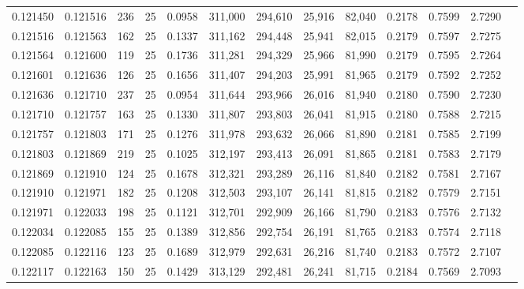 \begin{tabular}{rrrrrrrrrrrrr}
0.121450 & 0.121516 &   236 &  25 &                                     0.0958 & 311,000 & 294,610 &  25,916 &  82,040 & 0.2178 & 0.7599 & 2.7290 \\
0.121516 & 0.121563 &   162 &  25 &                                     0.1337 & 311,162 & 294,448 &  25,941 &  82,015 & 0.2179 & 0.7597 & 2.7275 \\
0.121564 & 0.121600 &   119 &  25 &                                     0.1736 & 311,281 & 294,329 &  25,966 &  81,990 & 0.2179 & 0.7595 & 2.7264 \\
0.121601 & 0.121636 &   126 &  25 &                                     0.1656 & 311,407 & 294,203 &  25,991 &  81,965 & 0.2179 & 0.7592 & 2.7252 \\
0.121636 & 0.121710 &   237 &  25 &                                     0.0954 & 311,644 & 293,966 &  26,016 &  81,940 & 0.2180 & 0.7590 & 2.7230 \\
0.121710 & 0.121757 &   163 &  25 &                                     0.1330 & 311,807 & 293,803 &  26,041 &  81,915 & 0.2180 & 0.7588 & 2.7215 \\
0.121757 & 0.121803 &   171 &  25 &                                     0.1276 & 311,978 & 293,632 &  26,066 &  81,890 & 0.2181 & 0.7585 & 2.7199 \\
0.121803 & 0.121869 &   219 &  25 &                                     0.1025 & 312,197 & 293,413 &  26,091 &  81,865 & 0.2181 & 0.7583 & 2.7179 \\
0.121869 & 0.121910 &   124 &  25 &                                     0.1678 & 312,321 & 293,289 &  26,116 &  81,840 & 0.2182 & 0.7581 & 2.7167 \\
0.121910 & 0.121971 &   182 &  25 &                                     0.1208 & 312,503 & 293,107 &  26,141 &  81,815 & 0.2182 & 0.7579 & 2.7151 \\
0.121971 & 0.122033 &   198 &  25 &                                     0.1121 & 312,701 & 292,909 &  26,166 &  81,790 & 0.2183 & 0.7576 & 2.7132 \\
0.122034 & 0.122085 &   155 &  25 &                                     0.1389 & 312,856 & 292,754 &  26,191 &  81,765 & 0.2183 & 0.7574 & 2.7118 \\
0.122085 & 0.122116 &   123 &  25 &                                     0.1689 & 312,979 & 292,631 &  26,216 &  81,740 & 0.2183 & 0.7572 & 2.7107 \\
0.122117 & 0.122163 &   150 &  25 &                                     0.1429 & 313,129 & 292,481 &  26,241 &  81,715 & 0.2184 & 0.7569 & 2.7093 \\

\end{tabular}
